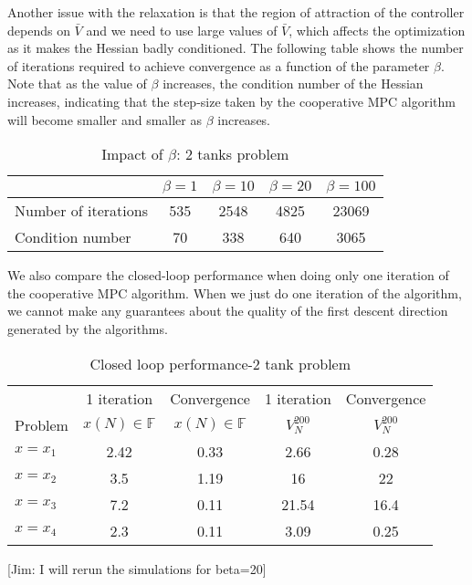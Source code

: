 \documentclass[10pt, twocolumn]{article}
\theoremstyle{definition}
\begin{document}
Another issue with the relaxation is that the region of attraction of the controller depends
on $\bar{V}$ and we need to use large values of $\bar{V}$, which
affects the optimization as it makes the Hessian badly
conditioned. The following table shows the number of iterations
required to achieve convergence as a function of the parameter
$\beta$. Note that as the value of $\beta$ increases, the condition
number of the Hessian increases, indicating that the step-size taken
by the cooperative MPC algorithm will become smaller and smaller as
$\beta$ increases. 
\begin{table}
\centering
\caption{Impact of $\beta$: 2 tanks problem}
\label{tab:beta_tank}
\begin{tabular}{l|cccc}\hline
&$\beta=1$&$\beta=10$&$\beta=20$ & $\beta=100$\\\hline
Number of iterations&535&2548&4825&23069\\
Condition number&70&338&640&3065\\
\end{tabular}
\end{table}


We also compare the closed-loop performance when doing only one
iteration of the cooperative MPC algorithm. When we just do one
iteration of the algorithm, we cannot make any guarantees about the
quality of the first descent direction generated by the algorithms.
\begin{table*}
\centering
\caption{Closed loop performance-2 tank problem}
\label{tab:loss_tank_cl}
\begin{tabular}{l|cccc}\hline
& 1 iteration & Convergence & 1 iteration & Convergence\\
Problem & $x(N) \in \mathbb{F}$&$x(N) \in \mathbb{F}$& $V_N^{200}$ &
$V_N^{200}$\\\hline
$x= x_1$& 2.42&0.33&2.66&0.28\\
$x= x_2$& 3.5&1.19&16&22\\
$x= x_3$& 7.2&0.11&21.54&16.4\\
$x= x_4$& 2.3&0.11&3.09&0.25\\
\hline
\end{tabular}
\end{table*}

[Jim: I will rerun the simulations for beta=20]
\end{document}
